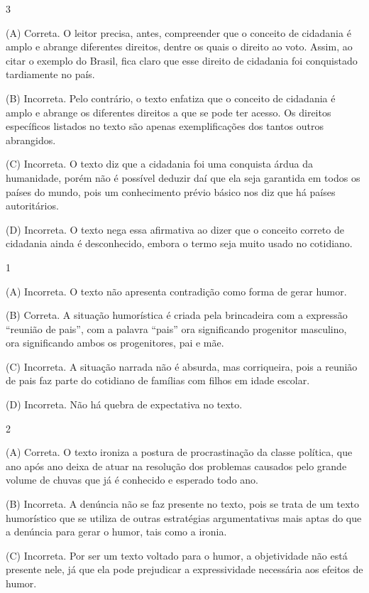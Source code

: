 \num{3}

(A) Correta. O leitor precisa, antes, compreender que o conceito de
cidadania é amplo e abrange diferentes direitos, dentre os quais o
direito ao voto. Assim, ao citar o exemplo do Brasil, fica claro que
esse direito de cidadania foi conquistado tardiamente no país. 

(B) Incorreta. Pelo contrário, o texto enfatiza que o conceito de cidadania
é amplo e abrange os diferentes direitos a que se pode ter acesso. Os
direitos específicos listados no texto são apenas exemplificações dos
tantos outros abrangidos. 

(C) Incorreta. O texto diz que a cidadania foi
uma conquista árdua da humanidade, porém não é possível deduzir daí que
ela seja garantida em todos os países do mundo, pois um conhecimento
prévio básico nos diz que há países autoritários. 

(D) Incorreta. O texto
nega essa afirmativa ao dizer que o conceito correto de cidadania ainda
é desconhecido, embora o termo seja muito usado no cotidiano.


\num{1}

(A) Incorreta. O texto não apresenta contradição como forma de gerar
humor. 

(B) Correta. A situação humorística é criada pela brincadeira com
a expressão ``reunião de pais'', com a palavra ``pais'' ora significando
progenitor masculino, ora significando ambos os progenitores, pai e mãe.

(C) Incorreta. A situação narrada não é absurda, mas corriqueira, pois a
reunião de pais faz parte do cotidiano de famílias com filhos em idade
escolar. 

(D) Incorreta. Não há quebra de expectativa no texto.

\num{2}

(A) Correta. O texto ironiza a postura de procrastinação da classe
política, que ano após ano deixa de atuar na resolução dos problemas
causados pelo grande volume de chuvas que já é conhecido e esperado todo
ano. 

(B) Incorreta. A denúncia não se faz presente no texto, pois se
trata de um texto humorístico que se utiliza de outras estratégias
argumentativas mais aptas do que a denúncia para gerar o humor, tais
como a ironia. 

(C) Incorreta. Por ser um texto voltado para o humor, a
objetividade não está presente nele, já que ela pode prejudicar a
expressividade necessária aos efeitos de humor. 

